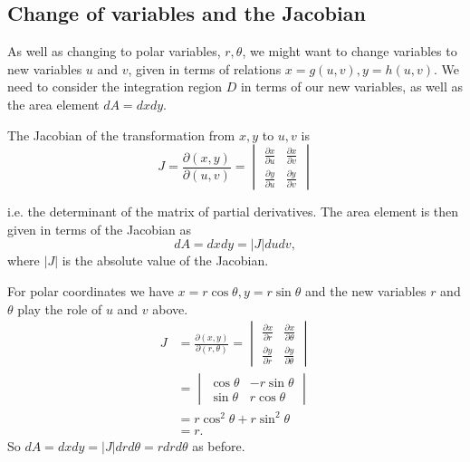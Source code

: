 \documentclass[10pt, a4paper]{article}
\begin{document}
\subsection{Change of variables and the Jacobian}
As well as changing to polar variables,
$r, \theta$,
we might want to change variables to new variables $u$ and $v$,
given in terms of relations $x = g(u, v), y = h(u, v)$.
We need to consider the integration region $D$ in terms of our new variables,
as well as the area element $dA = dxdy$.

\begin{definition}
    The Jacobian of the transformation from $x, y$ to $u, v$ is
    \[
    J = \frac{\partial(x, y)}{\partial(u, v)} = \begin{vmatrix}
        \frac{\partial x}{\partial u} & \frac{\partial x}{\partial v} \\
        \frac{\partial y}{\partial u} & \frac{\partial y}{\partial v}
    \end{vmatrix}
    \]
\end{definition}
i.e. the determinant of the matrix of partial derivatives.
The area element is then given in terms of the Jacobian as
\[
dA = dxdy = |J|dudv,
\]
where $|J|$ is the absolute value of the Jacobian.

\begin{example}
    For polar coordinates we have $x = r\cos\theta, y = r\sin\theta$ and the new variables $r$ and $\theta$ play the role of $u$ and $v$ above.
    \begin{align*}
    J &= \frac{\partial(x, y)}{\partial(r, \theta)} = \begin{vmatrix}
        \frac{\partial x}{\partial r} & \frac{\partial x}{\partial \theta} \\
        \frac{\partial y}{\partial r} & \frac{\partial y}{\partial \theta}
    \end{vmatrix} \\
    &=
    \begin{vmatrix}
        \cos\theta & -r\sin\theta \\ \sin\theta & r\cos\theta
    \end{vmatrix} \\
    &= r\cos ^ 2\theta + r\sin ^ 2\theta \\
    &= r.
    \end{align*}
    So $dA = dxdy = |J|drd\theta = rdrd\theta$ as before.
\end{example}
\end{document}
